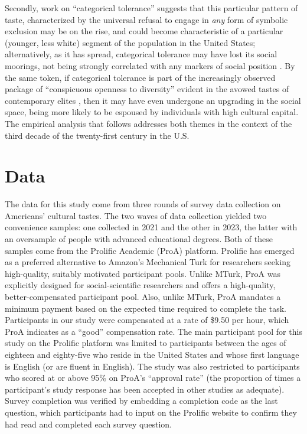 \documentclass[12pt]{article}
\begin{document}
Secondly, work on ``categorical tolerance'' suggests that this particular pattern of taste, characterized by the universal refusal to engage in \textit{any} form of symbolic exclusion may be on the rise, and could become characteristic of a particular (younger, less white) segment of the population in the United States; alternatively, as it has spread, categorical tolerance may have lost its social moorings, not being strongly correlated with any markers of social position \citep{lindblom2022growing-ded}. By the same token, if categorical tolerance is part of the increasingly observed package of ``conspicuous openness to diversity'' evident in the avowed tastes of contemporary elites \citep{ollivier2008modes-96f}, then it may have even undergone an upgrading in the social space, being more likely to be espoused by individuals with high cultural capital. The empirical analysis that follows addresses both themes in the context of the third decade of the twenty-first century in the U.S. 

\section*{Data}
The data for this study come from three rounds of survey data collection on Americans' cultural tastes. The two waves of data collection yielded two convenience samples: one collected in 2021 and the other in 2023, the latter with an oversample of people with advanced educational degrees. Both of these samples come from the Prolific Academic (ProA) platform. Prolific has emerged as a preferred alternative to Amazon’s Mechanical Turk for researchers seeking high-quality, suitably motivated participant pools. Unlike MTurk, ProA was explicitly designed for social-scientific researchers and offers a high-quality, better-compensated participant pool. Also, unlike MTurk, ProA mandates a minimum payment based on the expected time required to complete the task. Participants in our study were compensated at a rate of \$9.50 per hour, which ProA indicates as a “good” compensation rate. The main participant pool for this study on the Prolific platform was limited to participants between the ages of eighteen and eighty-five who reside in the United States and whose first language is English (or are fluent in English). The study was also restricted to participants who scored at or above 95\% on ProA’s ``approval rate'' (the proportion of times a participant’s study response has been accepted in other studies as adequate). Survey completion was verified by embedding a completion code as the last question, which participants had to input on the Prolific website to confirm they had read and completed each survey question.  
\end{document}
